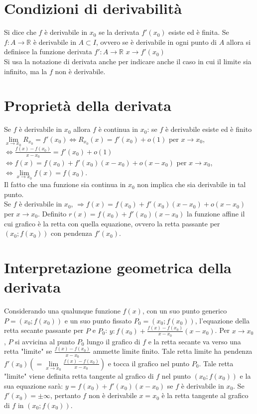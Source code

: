 \section{Condizioni di derivabilit\`a}
Si dice che $f$ \`e derivabile in $x_0$ se la derivata $f'(x_0)$ esiste ed \`e finita. Se $f:A\rightarrow\mathbb{R}$ \`e derivabile in $A\subset I$, ovvero se \`e derivabile in ogni punto di $A$ allora si definisce la funzione derivata $f':A\rightarrow\mathbb{R}$ $x\rightarrow f'(x_0)$\\
Si usa la notazione di derivata anche per indicare anche il caso in cui il limite sia infinito, ma la $f$ non \`e derivabile.
\section{Propriet\`a della derivata}
Se $f$ \`e derivabile in $x_0$ allora $f$ \`e continua in $x_0$: se $f$ \`e derivabile esiste ed \`e finito $\lim\limits_{x\rightarrow x_0}R_{x_0}=f'(x_0)\Leftrightarrow 
R_{x_0}(x)=f'(x_0)+o(1)$ per $x\rightarrow x_0$, $\Leftrightarrow\frac{f(x)-f(x_0)}{x-x_0}=f'(x_0)+o(1)$
$\Leftrightarrow f(x)=f(x_0)+f'(x_0)(x-x_0)+o(x-x_0)$ per $x\rightarrow x_0$, $\Leftrightarrow \lim\limits_{x\rightarrow x_0}f(x)=f(x_0)$.\\
Il fatto che una funzione sia continua in $x_0$ non implica che sia derivabile in tal punto.\\
Se $f$ \`e derivabile in $x_0$, $\Rightarrow f(x)=f(x_0)+f'(x_0)(x-x_0)+o(x-x_0)$ per $x\rightarrow x_0$. Definito $r(x)=f(x_0)+f'(x_0)(x-x_0)$ la funzione affine il cui 
grafico \`e la retta con quella equazione, ovvero la retta passante per $(x_0;f(x_0))$ con pendenza $f'(x_0)$.
\section{Interpretazione geometrica della derivata} 
Considerando una qualunque funzione $f(x)$, con un suo punto generico $P=(x_0;f(x_0))$ e un suo punto fissato $P_0=(x_0;f(x_0))$, l'equazione della retta secante passante per 
$P$ e $P_0$: $y:f(x_0)+\frac{f(x)-f(x_0)}{x-x_0}(x-x_0)$. Per $x\rightarrow x_0$, $P$ si avvicina al punto $P_0$ lungo il grafico di $f$ e la retta secante va verso una retta
"limite" se $\frac{f(x)-f(x_0)}{x-x_0}$  ammette limite finito. Tale retta limite ha pendenza $f'(x_0)(=\lim\limits_{x\rightarrow x_0}\frac{f(x)-f(x_0)}{x-x_0})$ e tocca il 
grafico nel punto $P_0$. Tale retta "limite" viene definita retta tangente al grafico di $f$ nel punto $(x_0;f(x_0))$ e la sua equazione sar\`a: $y=f(x_0)+f'(x_0)(x-x_0)$ se 
$f$ \`e derivabile in $x_0$. Se $f'(x_0)=\pm\infty$, pertanto $f$ non \`e derivabile $x=x_0$ \`e la retta tangente al grafico di $f$ in $(x_0;f(x_0))$.
